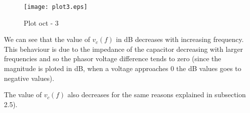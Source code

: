 \begin{figure}[ht]
	\centering
	\texttt{[image: plot3.eps]}
	\caption{Plot oct - 3}
\label{fig:Dsnh_sim_t2}
\end{figure}

We can see that the value of $v_c(f)$ in dB decreases with increasing frequency. This behaviour is due to the impedance of the capacitor decreasing with larger frequencies and so the phasor voltage difference tends to zero (since the magnitude is ploted in dB, when a voltage approaches 0 the dB values goes to negative values).

The value of $v_c(f)$ also decreases for the same reasons explained in subsection 2.5).



\newpage




